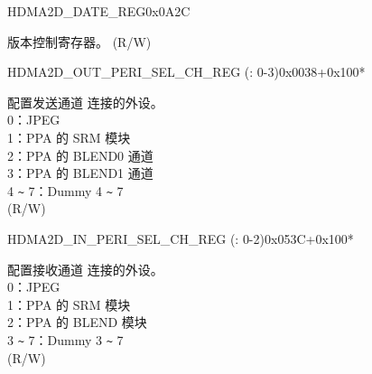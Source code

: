 \begin{register}{H}{DMA2D\_DATE\_REG}{0x0A2C}\label{regdesc:DMA2DDATEREG}
%
\regnewline%
\begin{regdesc}\begin{reglist}
\label{fielddesc:DMA2DDATE}\item [DMA2D\_DATE] 版本控制寄存器。 (R/W)
\end{reglist}\end{regdesc}
\end{register}


\begin{register}{H}{DMA2D\_OUT\_PERI\_SEL\_CH\_REG (: 0-3)}{0x0038+0x100*}\label{regdesc:DMA2DOUTPERISELCHNREG}
%
%
\regnewline%
\begin{regdesc}\begin{reglist}
\label{fielddesc:DMA2DOUTPERISELCHN}\item [DMA2D\_OUT\_PERI\_SEL\_CH\regindex{n}] 配置发送通道  连接的外设。\\
0：JPEG\\
1：PPA 的 SRM 模块\\
2：PPA 的 BLEND0 通道\\
3：PPA 的 BLEND1 通道\\
4 \verb+~+ 7：Dummy 4 \verb+~+ 7\\ (R/W)
\end{reglist}\end{regdesc}
\end{register}


\begin{register}{H}{DMA2D\_IN\_PERI\_SEL\_CH\_REG (: 0-2)}{0x053C+0x100*}\label{regdesc:DMA2DINPERISELCHNREG}
%
%
\regnewline%
\begin{regdesc}\begin{reglist}
\label{fielddesc:DMA2DINPERISELCHN}\item [DMA2D\_IN\_PERI\_SEL\_CH\regindex{n}] 配置接收通道  连接的外设。\\
0：JPEG\\
1：PPA 的 SRM 模块\\
2：PPA 的 BLEND 模块\\
3 \verb+~+ 7：Dummy 3 \verb+~+ 7\\ (R/W)
\end{reglist}\end{regdesc}
\end{register}
